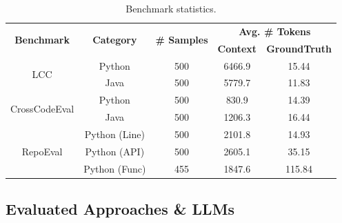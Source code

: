 \begin{table}[t]
    \centering
    \setlength{\tabcolsep}{2.7pt}
    \small
    \caption{Benchmark statistics.}
    \vspace{-5pt}
    \label{tab:Benchmark}
    \begin{tabular}{ccccc}
    \toprule
    \multirow{2}{*}{\textbf{Benchmark}} & \multirow{2}{*}{\textbf{Category}} & \multirow{2}{*}{\textbf{\# Samples}} & \multicolumn{2}{c}{\textbf{Avg. \# Tokens}} \\
    \cmidrule(lr){4-5} 
     &  &  & \textbf{Context} & \textbf{GroundTruth} \\
    \midrule
    \multirow{2}{*}{LCC} & Python  & 500 & 6466.9 & 15.44 \\
    & Java  & 500 & 5779.7 & 11.83 \\
    \cmidrule{1-5}
    \multirow{2}{*}{CrossCodeEval} & Python & 500 & 830.9 & 14.39\\
    & Java & 500 & 1206.3 & 16.44 \\
    \cmidrule{1-5}
    \multirow{3}{*}{RepoEval} & Python (Line) & 500 & 2101.8 & 14.93\\
    & Python (API) & 500 & 2605.1& 35.15\\
    & Python (Func) & 455 & 1847.6 & 115.84\\
    \bottomrule
    \end{tabular}
\end{table}

\subsection{Evaluated Approaches \& LLMs}
\label{approachs}
